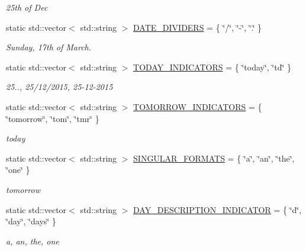 \begin{DoxyCompactItemize}
\begin{DoxyCompactList}\small\item\em 25th of Dec \end{DoxyCompactList}\item 
static std\+::vector$<$ std\+::string $>$ \hyperlink{class_do_lah_1_1_date_time_parser_a3f39609d7434c47c257dc17045d1913a}{D\+A\+T\+E\+\_\+\+D\+I\+V\+I\+D\+E\+R\+S} = \{ \char`\"{}/\char`\"{}, \char`\"{}-\/\char`\"{}, \char`\"{}.\char`\"{} \}
\begin{DoxyCompactList}\small\item\em Sunday, 17th of March. \end{DoxyCompactList}\item 
static std\+::vector$<$ std\+::string $>$ \hyperlink{class_do_lah_1_1_date_time_parser_adbc5291689a2864bf02beebbb4549489}{T\+O\+D\+A\+Y\+\_\+\+I\+N\+D\+I\+C\+A\+T\+O\+R\+S} = \{ \char`\"{}today\char`\"{}, \char`\"{}td\char`\"{} \}
\begin{DoxyCompactList}\small\item\em 25.., 25/12/2015, 25-\/12-\/2015 \end{DoxyCompactList}\item 
static std\+::vector$<$ std\+::string $>$ \hyperlink{class_do_lah_1_1_date_time_parser_a1bf675804ae4bafa0621681512b75573}{T\+O\+M\+O\+R\+R\+O\+W\+\_\+\+I\+N\+D\+I\+C\+A\+T\+O\+R\+S} = \{ \char`\"{}tomorrow\char`\"{}, \char`\"{}tom\char`\"{}, \char`\"{}tmr\char`\"{} \}
\begin{DoxyCompactList}\small\item\em today \end{DoxyCompactList}\item 
static std\+::vector$<$ std\+::string $>$ \hyperlink{class_do_lah_1_1_date_time_parser_a1c0a27093d6d779d5675195dd42f399c}{S\+I\+N\+G\+U\+L\+A\+R\+\_\+\+F\+O\+R\+M\+A\+T\+S} = \{ \char`\"{}a\char`\"{}, \char`\"{}an\char`\"{}, \char`\"{}the\char`\"{}, \char`\"{}one\char`\"{} \}
\begin{DoxyCompactList}\small\item\em tomorrow \end{DoxyCompactList}\item 
static std\+::vector$<$ std\+::string $>$ \hyperlink{class_do_lah_1_1_date_time_parser_a81a0b53c3a23599180092187e57fb66b}{D\+A\+Y\+\_\+\+D\+E\+S\+C\+R\+I\+P\+T\+I\+O\+N\+\_\+\+I\+N\+D\+I\+C\+A\+T\+O\+R} = \{ \char`\"{}d\char`\"{}, \char`\"{}day\char`\"{}, \char`\"{}days\char`\"{} \}
\begin{DoxyCompactList}\small\item\em a, an, the, one \end{DoxyCompactList}\item 

\end{DoxyCompactItemize}
